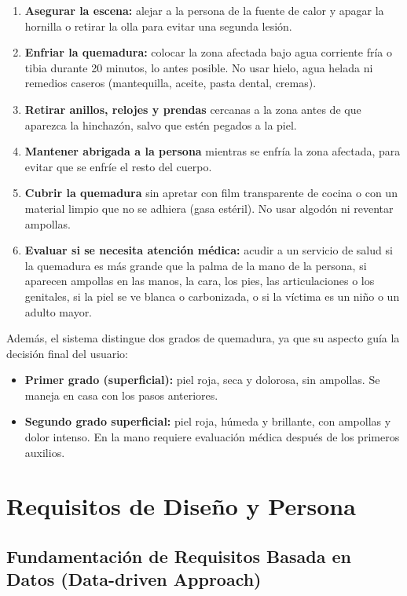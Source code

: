 \documentclass[11pt,letterpaper]{article}
\begin{document}
\begin{enumerate}[leftmargin=2em, itemsep=2pt]
  \item \textbf{Asegurar la escena:} alejar a la persona de la fuente de calor y apagar la hornilla o retirar la olla para evitar una segunda lesión.
  \item \textbf{Enfriar la quemadura:} colocar la zona afectada bajo agua corriente fría o tibia durante 20 minutos, lo antes posible. No usar hielo, agua helada ni remedios caseros (mantequilla, aceite, pasta dental, cremas).
  \item \textbf{Retirar anillos, relojes y prendas} cercanas a la zona antes de que aparezca la hinchazón, salvo que estén pegados a la piel.
  \item \textbf{Mantener abrigada a la persona} mientras se enfría la zona afectada, para evitar que se enfríe el resto del cuerpo.
  \item \textbf{Cubrir la quemadura} sin apretar con film transparente de cocina o con un material limpio que no se adhiera (gasa estéril). No usar algodón ni reventar ampollas.
  \item \textbf{Evaluar si se necesita atención médica:} acudir a un servicio de salud si la quemadura es más grande que la palma de la mano de la persona, si aparecen ampollas en las manos, la cara, los pies, las articulaciones o los genitales, si la piel se ve blanca o carbonizada, o si la víctima es un niño o un adulto mayor.
\end{enumerate}

Además, el sistema distingue dos grados de quemadura, ya que su aspecto guía la decisión final del usuario:

\begin{itemize}
  \item \textbf{Primer grado (superficial):} piel roja, seca y dolorosa, sin ampollas. Se maneja en casa con los pasos anteriores.
  \item \textbf{Segundo grado superficial:} piel roja, húmeda y brillante, con ampollas y dolor intenso. En la mano requiere evaluación médica después de los primeros auxilios.
\end{itemize}

\section{Requisitos de Diseño y Persona}

\subsection{Fundamentación de Requisitos Basada en Datos (Data-driven Approach)}
\end{document}
